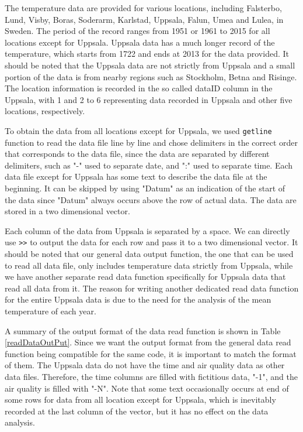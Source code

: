 
The temperature data are provided for various locations, including Falsterbo, Lund, Visby, Boras, Soderarm, Karlstad, Uppsala, Falun, Umea and Lulea, in Sweden. The period of the record ranges from 1951 or 1961 to 2015 for all locations except for Uppsala. Uppsala data has a much longer record of the temperature, which starts from 1722 and ends at 2013 for the data provided. It should be noted that the Uppsala data are not strictly from Uppsala and a small portion of the data is from nearby regions such as Stockholm, Betna and Risinge. The location information is recorded in the so called dataID column in the Uppsala, with 1 and 2 to 6 representing data recorded in Uppsala and other five locations, respectively. 

To obtain the data from all locations except for Uppsala, we used \texttt{getline} function to read the data file line by line and chose delimiters in the correct order that corresponds to the data file, since the data are separated by different delimiters, such as "-"  used to separate date, and ":" used to separate time. Each data file except for Uppsala has some text to describe the data file at the beginning. It can be skipped by using "Datum" as an indication of the start of the data since "Datum" always occurs above the row of actual data. The data are stored in a two dimensional vector. 

Each column of the data from Uppsala is separated by a space. We can directly use \texttt{>>} to output the data for each row and pass it to a two dimensional vector. It should be noted that our general data output function, the one that can be used to read all data file, only includes temperature data strictly from Uppsala, while we have another separate read data function specifically for Uppsala data that read all data from it. The reason for writing another dedicated read data function for the entire Uppsala data is due to the need for the analysis of the mean temperature of each year. 

A summary of the output format of the data read function is shown in Table \ref{readDataOutPut}. Since we want the output format from the general data read function being compatible for the same code, it is important to match the format of them. The Uppsala data do not have the time and air quality data as other data files. Therefore, the time columns are filled with fictitious data, "-1", and the air quality is filled with "-N". Note that some text occasionally occurs at end of some rows for data from all location except for Uppsala, which is inevitably recorded at the last column of the vector, but it has no effect on the data analysis. 


